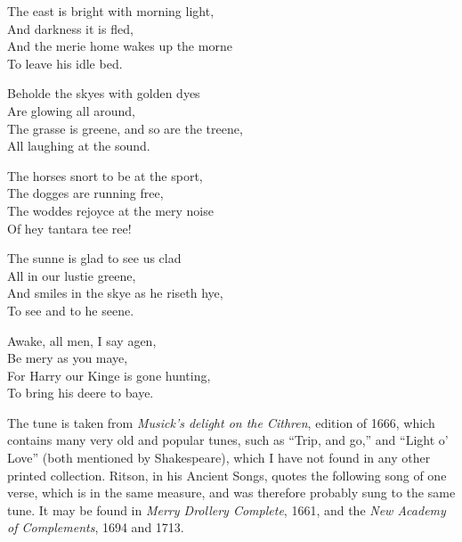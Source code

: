 \settowidth{\versewidth}{The east is bright with morning light,}
  \begin{dcverse}    \begin{altverse}
    The east is bright with morning light,\\
And darkness it is fled,\\
And the merie home wakes up the morne\\
To leave his idle bed.
\end{altverse}

\begin{altverse}{Beholde the skyes with golden dyes\\
Are glowing all around,\\
The grasse is greene, and so are the treene,\\
All laughing at the sound.}\end{altverse}

\begin{altverse}{The horses snort to be at the sport,\\
The dogges are running free,\\
The woddes rejoyce at the mery noise\\
Of hey tantara tee ree!}\end{altverse}

\begin{altverse}{The sunne is glad to see us clad\\
All in our lustie greene,\\
And smiles in the skye as he riseth hye,\\
To see and to he seene.}\end{altverse}

\end{dcverse}


\settowidth{\versewidth}{Awake, all men, I say agen,}
\begin{scverse}    \begin{altverse}{Awake, all men, I say agen,\\
Be mery as you maye,\\
For Harry our Kinge is gone hunting,\\
To bring his deere to baye.}\end{altverse}
\end{scverse}
\pagebreak
The tune is taken from \textit{Musick’s delight on the Cithren}, edition of 1666, which
contains many very old and popular tunes, such as “Trip, and go,” and “Light
o’ Love” (both mentioned by Shakespeare), which I have not found in any other
printed collection. Ritson, in his Ancient Songs, quotes the following song of
one verse, which is in the same measure, and was therefore probably sung to the
same tune. It may be found in \textit{Merry Drollery Complete}, 1661, and the \textit{New
Academy of Complements}, 1694 and 1713.

